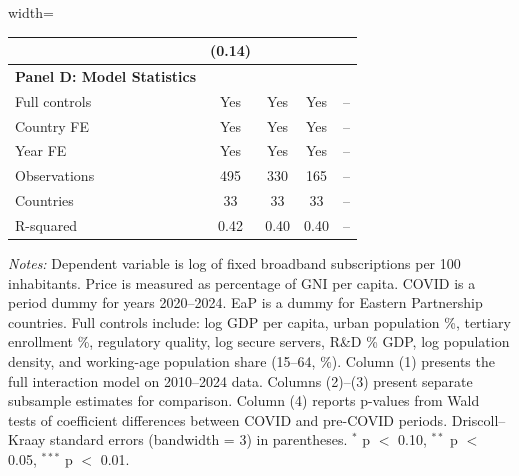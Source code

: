 \begin{table}[!htbp]
\begin{minipage}{\textwidth}
\begin{adjustbox}{width=\textwidth}
\begin{tabular}{@{}lcccc@{}}
& (0.14) & & & \\
\midrule
\textbf{Panel D: Model Statistics} \\
Full controls & Yes & Yes & Yes & -- \\
Country FE & Yes & Yes & Yes & -- \\
Year FE & Yes & Yes & Yes & -- \\
Observations & 495 & 330 & 165 & -- \\
Countries & 33 & 33 & 33 & -- \\
R-squared & 0.42 & 0.40 & 0.40 & -- \\
\bottomrule
\end{tabular}
\end{adjustbox}
\par\vspace{4pt}
\scriptsize
\textit{Notes:} Dependent variable is log of fixed broadband subscriptions per 100 inhabitants.
Price is measured as percentage of GNI per capita. COVID is a period dummy for years 2020--2024.
EaP is a dummy for Eastern Partnership countries. Full controls include: log GDP per capita,
urban population \%, tertiary enrollment \%, regulatory quality, log secure servers, R\&D \% GDP,
log population density, and working-age population share (15--64, \%). Column (1) presents the full interaction model
on 2010--2024 data. Columns (2)--(3) present separate subsample estimates for comparison.
Column (4) reports p-values from Wald tests of coefficient differences between COVID and
pre-COVID periods. Driscoll--Kraay standard errors (bandwidth = 3) in parentheses.
$^{*}$ p $<$ 0.10, $^{**}$ p $<$ 0.05, $^{***}$ p $<$ 0.01.
\end{minipage}
\end{table}
